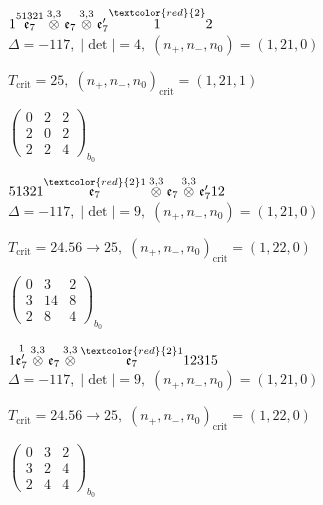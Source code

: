 \documentclass[10pt]{article}
\begin{document}
\smallskip

$1\overset{51321}{\mathfrak{e}_7}\overset{3,3}{\otimes}\mathfrak{e}_7\overset{3,3}{\otimes}\mathfrak{e}_7'\overset{\textcolor{red}{2}}{1}2$ \quad $\Delta=-117,\; |\det|=4,\; (n_+,n_-,n_0)=(1,21,0)$

\hspace{1em}$T_{\text{crit}}=25,\; (n_+,n_-,n_0)_{\text{crit}}=(1,21,1)$

\hspace{2em}$\left(\begin{smallmatrix}0 & 2 & 2 \\ 2 & 0 & 2 \\ 2 & 2 & 4\end{smallmatrix}\right)_{\!b_0}$

$51321\overset{\textcolor{red}{2}1}{\mathfrak{e}_7}\overset{3,3}{\otimes}\mathfrak{e}_7\overset{3,3}{\otimes}\mathfrak{e}_7'12$ \quad $\Delta=-117,\; |\det|=9,\; (n_+,n_-,n_0)=(1,21,0)$

\hspace{1em}$T_{\text{crit}}=24.56 \to 25,\; (n_+,n_-,n_0)_{\text{crit}}=(1,22,0)$

\hspace{2em}$\left(\begin{smallmatrix}0 & 3 & 2 \\ 3 & 14 & 8 \\ 2 & 8 & 4\end{smallmatrix}\right)_{\!b_0}$

\smallskip

$1\overset{1}{\mathfrak{e}_7'}\overset{3,3}{\otimes}\mathfrak{e}_7\overset{3,3}{\otimes}\overset{\textcolor{red}{2}1}{\mathfrak{e}_7}12315$ \quad $\Delta=-117,\; |\det|=9,\; (n_+,n_-,n_0)=(1,21,0)$

\hspace{1em}$T_{\text{crit}}=24.56 \to 25,\; (n_+,n_-,n_0)_{\text{crit}}=(1,22,0)$

\hspace{2em}$\left(\begin{smallmatrix}0 & 3 & 2 \\ 3 & 2 & 4 \\ 2 & 4 & 4\end{smallmatrix}\right)_{\!b_0}$
\end{document}
